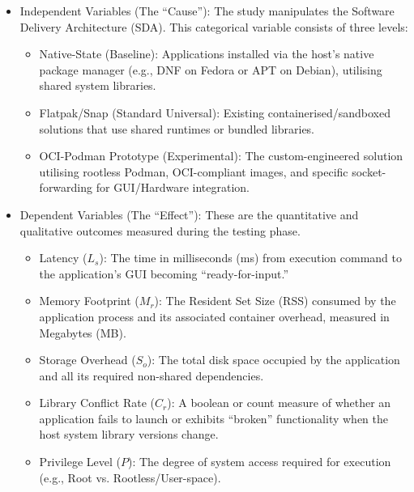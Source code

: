 \documentclass[journal,onecolumn]{IEEEtran}
\begin{document}
\begin{itemize}
    \item Independent Variables (The ``Cause''): The study manipulates the Software Delivery Architecture (SDA). This categorical variable consists of three levels:
    \begin{itemize}
        \item Native-State (Baseline): Applications installed via the host's native package manager (e.g., DNF on Fedora or APT on Debian), utilising shared system libraries.
        \item Flatpak/Snap (Standard Universal): Existing containerised/sandboxed solutions that use shared runtimes or bundled libraries.
        \item OCI-Podman Prototype (Experimental): The custom-engineered solution utilising rootless Podman, OCI-compliant images, and specific socket-forwarding for GUI/Hardware     integration.
    \end{itemize}
    \item Dependent Variables (The ``Effect''): These are the quantitative and qualitative outcomes measured during the testing phase.
    \begin{itemize}
        \item Latency ($L_s$): The time in milliseconds (ms) from execution command to the application's GUI becoming ``ready-for-input.''
        \item Memory Footprint ($M_r$): The Resident Set Size (RSS) consumed by the application process and its associated container overhead, measured in Megabytes (MB).
        \item Storage Overhead ($S_o$): The total disk space occupied by the application and all its required non-shared dependencies.
        \item Library Conflict Rate ($C_r$): A boolean or count measure of whether an application fails to launch or exhibits ``broken'' functionality when the host system library versions change.
        \item Privilege Level ($P$): The degree of system access required for execution (e.g., Root vs. Rootless/User-space).
    \end{itemize}
    
\end{itemize}




\paragraph{}
\end{document}
